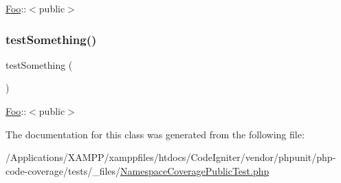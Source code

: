 \mbox{\hyperlink{class_foo}{Foo}}\+:\+:$<$public$>$ \mbox{\label{class_namespace_coverage_public_test_a0fc4e17369bc9607ebdd850d9eda8167}} 
\subsubsection{\texorpdfstring{test\+Something()}{testSomething()}\hspace{0.1cm}{\footnotesize\ttfamily [2/2]}}
{\footnotesize\ttfamily test\+Something (\begin{DoxyParamCaption}{ }\end{DoxyParamCaption})}

\mbox{\hyperlink{class_foo}{Foo}}\+:\+:$<$public$>$ 

The documentation for this class was generated from the following file\+:\begin{DoxyCompactItemize}
\item 
/\+Applications/\+X\+A\+M\+P\+P/xamppfiles/htdocs/\+Code\+Igniter/vendor/phpunit/php-\/code-\/coverage/tests/\+\_\+files/\mbox{\hyperlink{php-code-coverage_2tests_2__files_2_namespace_coverage_public_test_8php}{Namespace\+Coverage\+Public\+Test.\+php}}\end{DoxyCompactItemize}
